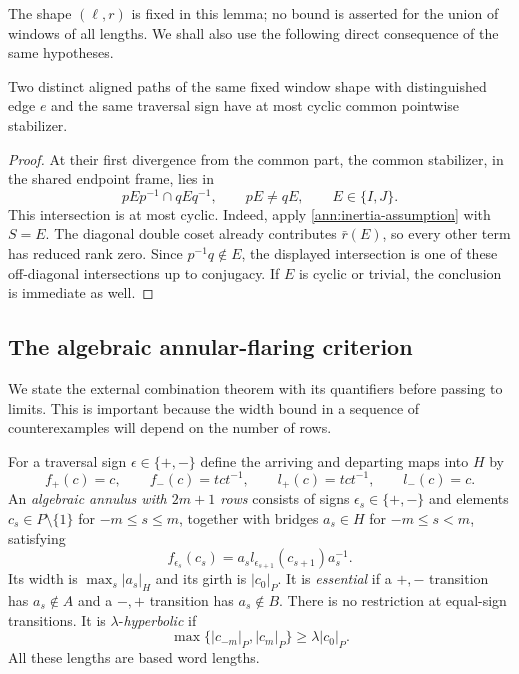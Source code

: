 The shape $(\ell,r)$ is fixed in this lemma; no bound is asserted for the
union of windows of all lengths.  We shall also use the following direct
consequence of the same hypotheses.

\begin{lemma}
\label{ann:distinct-paths}
Two distinct aligned paths of the same fixed window shape with
distinguished edge $e$ and the same traversal sign have at most cyclic
common pointwise stabilizer.
\end{lemma}

\begin{proof}
At their first divergence from the common part, the common stabilizer,
in the shared endpoint frame, lies in
\[
 pEp^{-1}\cap qEq^{-1},\qquad pE\ne qE,
 \qquad E\in\{I,J\}.
\]
This intersection is at most cyclic.  Indeed, apply
\eqref{ann:inertia-assumption} with $S=E$.  The diagonal double coset
already contributes $\bar r(E)$, so every other term has reduced rank
zero.  Since $p^{-1}q\notin E$, the displayed intersection is one of
these off-diagonal intersections up to conjugacy.  If $E$ is cyclic or
trivial, the conclusion is immediate as well.
\end{proof}

\subsection{The algebraic annular-flaring criterion}

We state the external combination theorem with its quantifiers before
passing to limits.  This is important because the width bound in a
sequence of counterexamples will depend on the number of rows.

For a traversal sign $\epsilon\in\{+,-\}$ define the arriving and
departing maps into $H$ by
\[
 f_+(c)=c,\qquad f_-(c)=tct^{-1},\qquad
 l_+(c)=tct^{-1},\qquad l_-(c)=c.
\]
An \emph{algebraic annulus with $2m+1$ rows} consists of signs
$\epsilon_s\in\{+,-\}$ and elements $c_s\in P\setminus\{1\}$ for
$-m\leq s\leq m$, together with bridges $a_s\in H$ for
$-m\leq s<m$, satisfying
\begin{equation}
 f_{\epsilon_s}(c_s)
   =a_s l_{\epsilon_{s+1}}(c_{s+1})a_s^{-1}.
 \label{ann:row-equation}
\end{equation}
Its width is $\max_s|a_s|_H$ and its girth is $|c_0|_P$.  It is
\emph{essential} if a $+,-$ transition has $a_s\notin A$ and a $-,+$
transition has $a_s\notin B$.  There is no restriction at equal-sign
transitions.  It is $\lambda$-\emph{hyperbolic} if
\[
 \max\{|c_{-m}|_P,|c_m|_P\}\geq\lambda|c_0|_P.
\]
All these lengths are based word lengths.

